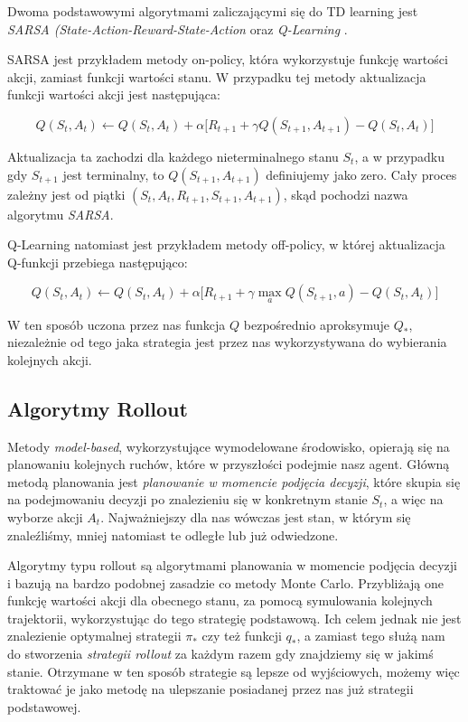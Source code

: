 \documentclass[licencjacka]{pracamgr}
\begin{document}
Dwoma podstawowymi algorytmami zaliczającymi się do TD learning jest \emph{SARSA (State-Action-Reward-State-Action} \cite{SARSA} oraz \emph{Q-Learning} \cite{Q-learning}.

SARSA jest przykładem metody on-policy, która wykorzystuje funkcję wartości akcji, zamiast funkcji wartości stanu. W przypadku tej metody aktualizacja funkcji wartości akcji jest następująca:

$$ Q(S_t, A_t) \leftarrow Q(S_t, A_t) + \alpha \big[R_{t+1} + \gamma Q(S_{t+1}, A_{t+1}) - Q(S_t, A_t) \big] $$

Aktualizacja ta zachodzi dla każdego nieterminalnego stanu $S_t$, a w przypadku gdy $S_{t+1}$ jest terminalny, to $ Q(S_{t+1}, A_{t+1}) $ definiujemy jako zero. Cały proces zależny jest od piątki $ (S_t, A_t, R_{t+1}, S_{t+1}, A_{t+1}) $, skąd pochodzi nazwa algorytmu \emph{SARSA}.

Q-Learning natomiast jest przykładem metody off-policy, w której aktualizacja Q-funkcji przebiega następująco:

$$ Q(S_t, A_t) \leftarrow Q(S_t, A_t) + \alpha \big[R_{t+1} + \gamma \max_a Q(S_{t+1}, a) - Q(S_t, A_t) \big] $$

W ten sposób uczona przez nas funkcja $Q$ bezpośrednio aproksymuje $Q_\ast$, niezależnie od tego jaka strategia jest przez nas wykorzystywana do wybierania kolejnych akcji.

\subsection{Algorytmy Rollout}

Metody \emph{model-based}, wykorzystujące wymodelowane środowisko, opierają się na planowaniu kolejnych ruchów, które w przyszłości podejmie nasz agent. Główną metodą planowania jest \emph{planowanie w momencie podjęcia decyzji}, które skupia się na podejmowaniu decyzji po znalezieniu się w konkretnym stanie $S_t$, a więc na wyborze akcji $A_t$. Najważniejszy dla nas wówczas jest stan, w którym się znaleźliśmy, mniej natomiast te odległe lub już odwiedzone. 

Algorytmy typu rollout są algorytmami planowania w momencie podjęcia decyzji  i bazują na bardzo podobnej zasadzie co metody Monte Carlo. Przybliżają one funkcję wartości akcji dla obecnego stanu, za pomocą symulowania kolejnych trajektorii, wykorzystując do tego strategię podstawową. Ich celem jednak nie jest znalezienie optymalnej strategii $\pi_\ast$ czy też funkcji $q_\ast$, a zamiast tego służą nam do stworzenia \emph{strategii rollout} za każdym razem gdy znajdziemy się w jakimś stanie. Otrzymane w ten sposób strategie są lepsze od wyjściowych, możemy więc traktować je jako metodę na ulepszanie posiadanej przez nas już strategii podstawowej.
\end{document}
